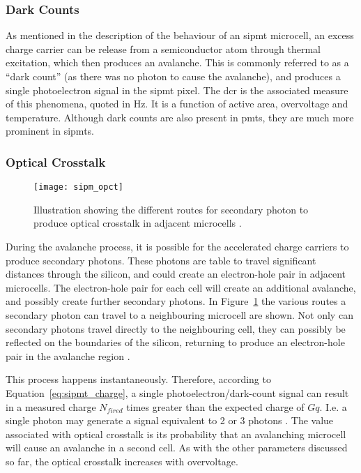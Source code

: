 \subsubsection{Dark Counts}

As mentioned in the description of the behaviour of an \gls{sipmt} microcell, an excess charge carrier can be release from a semiconductor atom through thermal excitation, which then produces an avalanche. This is commonly referred to as a ``dark count'' (as there was no photon to cause the avalanche), and produces a single photoelectron signal in the \gls{sipmt} pixel. The \gls{dcr} is the associated measure of this phenomena, quoted in \si{Hz}. It is a function of active area, overvoltage and temperature. Although dark counts are also present in \glspl{pmt}, they are much more prominent in \glspl{sipmt}.

\subsubsection{Optical Crosstalk}

\begin{figure}
	\centering
    \texttt{[image: sipm\_opct]} 
	\caption[Illustration of the possible ways optical crosstalk is produced.]{Illustration showing the different routes for secondary photon to produce optical crosstalk in adjacent microcells \cite{Rech2008}.}
	\label{fig:sipm_opct}
\end{figure}

During the avalanche process, it is possible for the accelerated charge carriers to produce secondary photons. These photons are table to travel significant distances through the silicon, and could create an electron-hole pair in adjacent microcells. The electron-hole pair for each cell will create an additional avalanche, and possibly create further secondary photons. In Figure~\ref{fig:sipm_opct} the various routes a secondary photon can travel to a neighbouring microcell are shown. Not only can secondary photons travel directly to the neighbouring cell, they can possibly be reflected on the boundaries of the silicon, returning to produce an electron-hole pair in the avalanche region \cite{Rech2008}.

This process happens instantaneously. Therefore, according to Equation~\ref{eq:sipmt_charge}, a single photoelectron/dark-count signal can result in a measured charge $N_{fired}$ times greater than the expected charge of $G q$. I.e. a single photon may generate a signal equivalent to 2 or 3 photons \cite{SensL2011}. The value associated with optical crosstalk is its probability that an avalanching microcell will cause an avalanche in a second cell. As with the other parameters discussed so far, the optical crosstalk increases with overvoltage.

